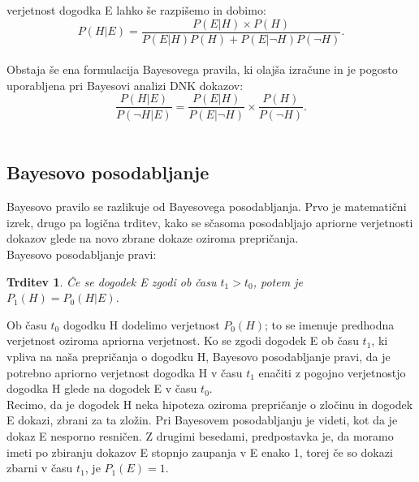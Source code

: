 \documentclass[12pt,a4paper]{amsart}
\theoremstyle{definition} %
\theoremstyle{plain} %
\newtheorem{trditev}[definicija]{Trditev}
\begin{document}
verjetnost dogodka E lahko še razpišemo in dobimo:
\begin{equation}\label{eq:b_pravilo}
    P(H \lvert E) = \frac{P(E \lvert H) \times P(H)}{P(E \lvert H)P(H) + P(E \lvert \neg H)P(\neg H)}.
\end{equation} \\

Obstaja še ena formulacija Bayesovega pravila, ki olajša izračune in je pogosto uporabljena pri Bayesovi analizi DNK dokazov:
\begin{equation}\label{eq:b_pravilo_DNK}
    \frac{P(H \lvert E)}{P(\neg H \lvert E)} = \frac{P(E \lvert H)}{P(E \lvert \neg H)} \times \frac{P(H)}{P(\neg H)}.
\end{equation}\\

\subsection{Bayesovo posodabljanje}
Bayesovo pravilo se razlikuje od Bayesovega posodabljanja. Prvo je matematični izrek, drugo pa logična trditev, kako se sčasoma posodabljajo 
apriorne verjetnosti dokazov glede na novo zbrane dokaze oziroma prepričanja. \\

Bayesovo posodabljanje pravi:
\begin{trditev}
Če se dogodek E zgodi ob času $t_1 > t_0$, potem je $P_1(H) = P_0(H \lvert E)$.
\end{trditev}

Ob času $t_0$ dogodku H dodelimo verjetnost $P_0(H)$; to se imenuje predhodna verjetnost oziroma apriorna verjetnost. Ko se zgodi dogodek E 
ob času $t_1$, ki vpliva na naša prepričanja o dogodku H, Bayesovo posodabljanje pravi, da je potrebno apriorno verjetnost dogodka H v času $t_1$ 
enačiti z pogojno verjetnostjo dogodka H glede na dogodek E v času $t_0$. \\

Recimo, da je dogodek H neka hipoteza oziroma prepričanje o zločinu in dogodek E dokazi, zbrani za ta zložin. Pri Bayesovem posodabljanju je videti, 
kot da je dokaz E nesporno resničen. Z drugimi besedami, predpostavka je, da moramo imeti po zbiranju dokazov E stopnjo zaupanja v E enako 1, 
torej če so dokazi zbarni v času $t_1$, je $P_1(E)=1$. \\\\
\end{document}
